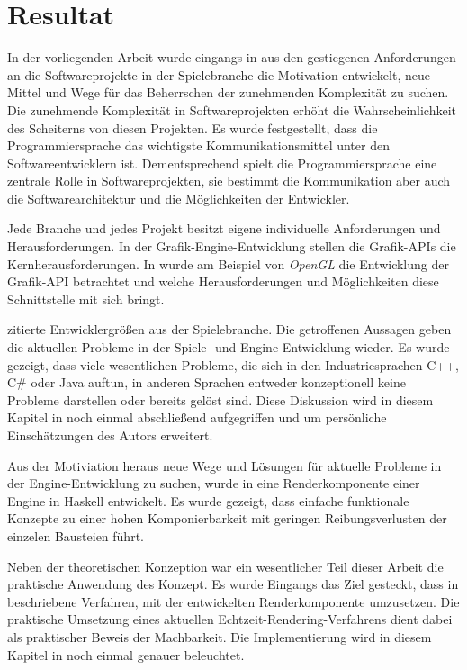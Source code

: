\chapter{Resultat}
\label{chap:resultat}

In der vorliegenden Arbeit wurde eingangs in  aus den gestiegenen Anforderungen an die Softwareprojekte in der Spielebranche die Motivation entwickelt, neue Mittel und Wege für das Beherrschen der zunehmenden Komplexität zu suchen. Die zunehmende Komplexität in Softwareprojekten erhöht die Wahrscheinlichkeit des Scheiterns von diesen Projekten. Es wurde festgestellt, dass die Programmiersprache das wichtigste Kommunikationsmittel unter den Softwareentwicklern ist. Dementsprechend spielt die Programmiersprache eine zentrale Rolle in Softwareprojekten, sie bestimmt die Kommunikation aber auch die Softwarearchitektur und die Möglichkeiten der Entwickler.

Jede Branche und jedes Projekt besitzt eigene individuelle Anforderungen und Herausforderungen. In der Grafik-Engine-Entwicklung stellen die Grafik-\ac{API}s die Kernherausforderungen. In  wurde am Beispiel von \textit{OpenGL} die Entwicklung der Grafik-\ac{API} betrachtet und welche Herausforderungen und Möglichkeiten diese Schnittstelle mit sich bringt.

 zitierte Entwicklergrößen aus der Spielebranche. Die getroffenen Aussagen geben die aktuellen Probleme in der Spiele- und Engine-Entwicklung wieder. Es wurde gezeigt, dass viele wesentlichen Probleme, die sich in den Industriesprachen C++, C\# oder Java auftun, in anderen Sprachen entweder konzeptionell keine Probleme darstellen oder bereits gelöst sind. Diese Diskussion wird in diesem Kapitel in  noch einmal abschließend aufgegriffen und um persönliche Einschätzungen des Autors erweitert.

Aus der Motiviation heraus neue Wege und Lösungen für aktuelle Probleme in der Engine-Entwicklung zu suchen, wurde in  eine Renderkomponente einer Engine in Haskell entwickelt. Es wurde gezeigt, dass einfache funktionale Konzepte zu einer hohen Komponierbarkeit mit geringen Reibungsverlusten der einzelen Bausteien führt.

Neben der theoretischen Konzeption war ein wesentlicher Teil dieser Arbeit die praktische Anwendung des Konzept. Es wurde Eingangs das Ziel gesteckt, dass in  beschriebene Verfahren, mit der entwickelten Renderkomponente umzusetzen. Die praktische Umsetzung eines aktuellen Echtzeit-Rendering-Verfahrens dient dabei als praktischer Beweis der Machbarkeit. Die Implementierung wird in diesem Kapitel in  noch einmal genauer beleuchtet.

